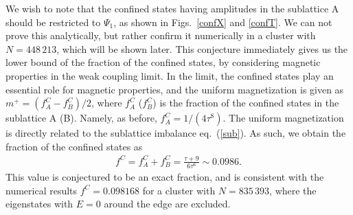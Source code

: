 \documentclass[aps,twocolumn,pra,superscriptaddress,amsmath,amssymb]{revtex4-1}
\begin{document}
We wish to note that the confined states having amplitudes in the sublattice A
should be restricted to $\Psi_1$, as shown in Figs.~\ref{confX} and \ref{confT}.
We can not prove this analytically, but rather confirm it numerically in a cluster with $N=448\,213$,
which will be shown later.
This conjecture immediately gives us the lower bound of
the fraction of the confined states,
by considering magnetic properties in the weak coupling limit.
In the limit, the confined states play an essential role
for magnetic properties, and the uniform magnetization is given as
$m^+=(f^C_{A}-f^C_{B})/2$,
where $f^C_{A}$ ($f^C_B$) is the fraction of the confined states
in the sublattice A (B).
Namely, as before, $f^C_A=1/(4\tau^8)$.
The uniform magnetization is directly related to
the sublattice imbalance eq.~(\ref{sub}).
As such, we obtain the fraction of the confined states as
\begin{eqnarray}
  f^C=f^C_A+f^C_B=\frac{\tau+9}{6\tau^6}\sim 0.0986.
\end{eqnarray}
This value is conjectured to be an exact fraction, and is consistent with the numerical results
$f^C=0.098168$ for a cluster with $N=835\,393$,
where the eigenstates with $E=0$ around the edge are excluded.



\end{document}
